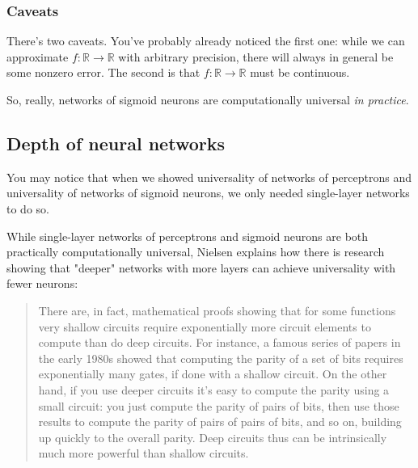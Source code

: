 \documentclass{article}
\begin{document}
	\subsubsection*{Caveats}
	
	There's two caveats. You've probably already noticed the first one: while we can approximate $f:\mathbb{R} \rightarrow \mathbb{R}$ with arbitrary precision, there will always in general be some nonzero error. The second is that $f:\mathbb{R} \rightarrow \mathbb{R}$ must be continuous.
	
	So, really, networks of sigmoid neurons are computationally universal \textit{in practice}.
	
	\subsection*{Depth of neural networks}
	
	You may notice that when we showed universality of networks of perceptrons and universality of networks of sigmoid neurons, we only needed single-layer networks to do so.
	
	While single-layer networks of perceptrons and sigmoid neurons are both practically computationally universal, Nielsen explains how there is research showing that "deeper" networks with more layers can achieve universality with fewer neurons:
	
	\begin{quote}
		There are, in fact, mathematical proofs showing that for some functions very shallow circuits require exponentially more circuit elements to compute than do deep circuits. For instance, a famous series of papers in the early 1980s showed that computing the parity of a set of bits requires exponentially many gates, if done with a shallow circuit. On the other hand, if you use deeper circuits it's easy to compute the parity using a small circuit: you just compute the parity of pairs of bits, then use those results to compute the parity of pairs of pairs of bits, and so on, building up quickly to the overall parity. Deep circuits thus can be intrinsically much more powerful than shallow circuits.
	\end{quote}
\end{document}
